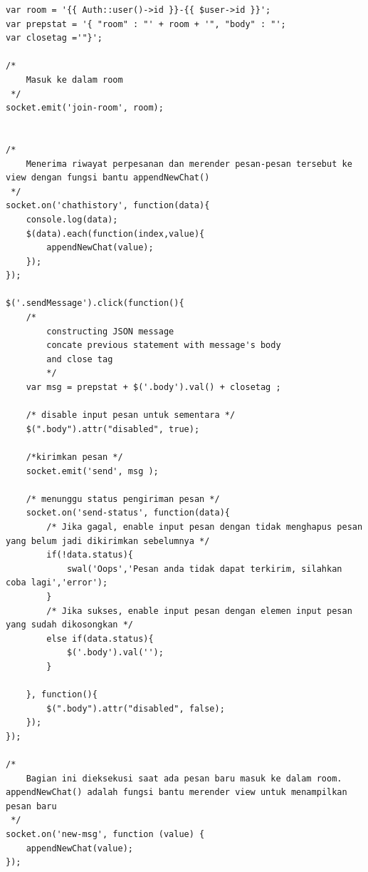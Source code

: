 \begin{lstlisting}[label=cdsoc.04-04,style=htmlcssjs,caption=Kode Sumber Logika Pengiriman \& Penerimaan Pesan (menggunakan jQuery)]
var room = '{{ Auth::user()->id }}-{{ $user->id }}';
var prepstat = '{ "room" : "' + room + '", "body" : "';
var closetag ='"}';

/* 
	Masuk ke dalam room
 */
socket.emit('join-room', room);


/* 
	Menerima riwayat perpesanan dan merender pesan-pesan tersebut ke view dengan fungsi bantu appendNewChat()
 */
socket.on('chathistory', function(data){
    console.log(data);
    $(data).each(function(index,value){
        appendNewChat(value);
    });
});

$('.sendMessage').click(function(){
	/*	
		constructing JSON message 
		concate previous statement with message's body
		and close tag
		*/
    var msg = prepstat + $('.body').val() + closetag ;

    /* disable input pesan untuk sementara */
    $(".body").attr("disabled", true);

    /*kirimkan pesan */
    socket.emit('send', msg );

    /* menunggu status pengiriman pesan */
    socket.on('send-status', function(data){
    	/* Jika gagal, enable input pesan dengan tidak menghapus pesan yang belum jadi dikirimkan sebelumnya */
        if(!data.status){
            swal('Oops','Pesan anda tidak dapat terkirim, silahkan coba lagi','error');
        }
        /* Jika sukses, enable input pesan dengan elemen input pesan yang sudah dikosongkan */
        else if(data.status){
            $('.body').val('');
        }

    }, function(){
        $(".body").attr("disabled", false);
    });
});

/* 
	Bagian ini dieksekusi saat ada pesan baru masuk ke dalam room. appendNewChat() adalah fungsi bantu merender view untuk menampilkan pesan baru
 */
socket.on('new-msg', function (value) {
    appendNewChat(value);
});
\end{lstlisting}